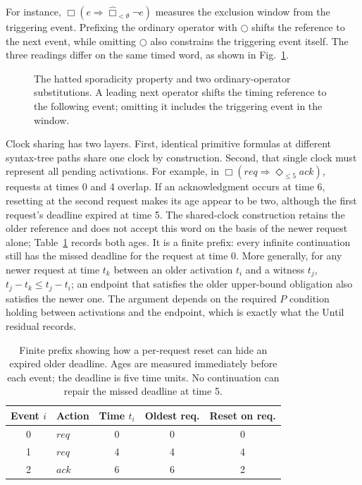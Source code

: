 \documentclass[10pt,journal,compsoc]{IEEEtran}
\begin{document}
For instance, $\Box(e\Rightarrow\widehat{\Box}_{<\theta}\neg e)$ measures
the exclusion window from the triggering event. Prefixing the ordinary
operator with $\bigcirc$ shifts the reference to the next event, while
omitting $\bigcirc$ also constrains the triggering event itself. The three
readings differ on the same timed word, as shown in Fig.~\ref{fig:hat-reference}.
\begin{figure}[t]
\centering

\caption{The hatted sporadicity property and two ordinary-operator
substitutions. A leading next operator shifts the timing reference to the
following event; omitting it includes the triggering event in the window.}
\label{fig:hat-reference}
\end{figure}

Clock sharing has two layers. First, identical primitive formulas at
different syntax-tree paths share one clock by construction. Second, that
single clock must represent all pending activations. For example, in
$\Box(\mathit{req}\Rightarrow\Diamond_{\le5}\mathit{ack})$, requests at times
0 and 4 overlap. If an acknowledgment occurs at time 6, resetting at the
second request makes its age appear to be two, although the first request's
deadline expired at time 5. The shared-clock construction retains the older
reference and does not accept this word on the basis of the newer request
alone; Table~\ref{tab:overlap-example} records both ages. It is a finite
prefix: every infinite continuation still has the missed deadline for the
request at time 0. More generally, for
any newer request at time $t_k$ between an older activation $t_i$ and a
witness $t_j$, $t_j-t_k\le t_j-t_i$; an endpoint that satisfies the older
upper-bound obligation also satisfies the newer one. The argument depends on
the required $P$ condition holding between activations and the endpoint,
which is exactly what the Until residual records.

\begin{table}[t]
\centering
\caption{Finite prefix showing how a per-request reset can hide an expired
older deadline. Ages are measured immediately before each event; the deadline
is five time units. No continuation can repair the missed deadline at time 5.}
\label{tab:overlap-example}
\footnotesize
\begin{tabular}{@{}clccc@{}}
\toprule
Event $i$ & Action & Time $t_i$ & Oldest req. & Reset on req.\\
\midrule
0 & $\mathit{req}$ & 0 & 0 & 0\\
1 & $\mathit{req}$ & 4 & 4 & 4\\
2 & $\mathit{ack}$ & 6 & 6 & 2\\
\bottomrule
\end{tabular}
\end{table}
\end{document}
